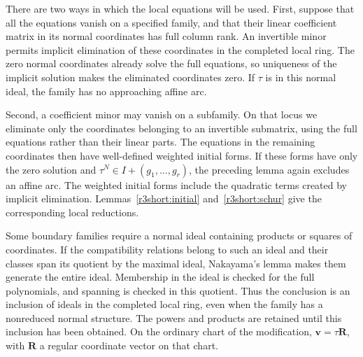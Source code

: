\documentclass[11pt,a4paper]{article}
\numberwithin{equation}{section}
\theoremstyle{plain}
\theoremstyle{definition}
\theoremstyle{remark}
\begin{document}
There are two ways in which the local equations will be used.
First, suppose that all the equations vanish on a specified
family, and that their linear coefficient matrix in its normal
coordinates has full column rank. An invertible minor permits
implicit elimination of these coordinates in the completed local
ring. The zero normal coordinates already solve the full
equations, so uniqueness of the implicit solution makes the
eliminated coordinates zero. If $\tau$ is in this normal ideal,
the family has no approaching affine arc.

Second, a coefficient minor may vanish on a subfamily. On that
locus we eliminate only the coordinates belonging to an
invertible submatrix, using the full equations rather than their
linear parts. The equations in the remaining coordinates then
have well-defined weighted initial forms. If these forms have
only the zero solution and
$\tau^N\in I+(g_1,\ldots,g_r)$, the preceding lemma again
excludes an affine arc. The weighted initial forms include the
quadratic terms created by implicit elimination.
Lemmas~\ref{r3short:initial} and~\ref{r3short:schur} give the
corresponding local reductions.

Some boundary families require a normal ideal containing products
or squares of coordinates. If the compatibility relations belong to such an
ideal and their classes span its quotient by the maximal ideal,
Nakayama's lemma makes them generate the entire ideal. Membership
in the ideal is checked for the full polynomials, and spanning is
checked in this quotient. Thus the conclusion is an inclusion of
ideals in the completed local ring, even when the family has a
nonreduced normal structure. The powers and products are retained
until this inclusion has been obtained.
On the ordinary chart of the modification,
$\boldsymbol v=\tau\boldsymbol R$, with $\boldsymbol R$ a regular
coordinate vector on that chart.
\end{document}
